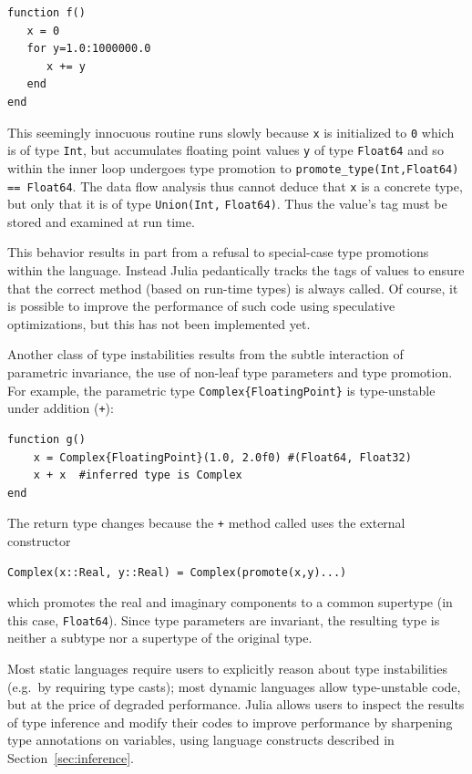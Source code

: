 \documentclass[10pt, preprint]{sigplanconf}
\begin{document}
\begin{lstlisting}
function f()
   x = 0
   for y=1.0:1000000.0
      x += y
   end
end
\end{lstlisting}
%
This seemingly innocuous routine runs slowly because \verb|x| is initialized to
\verb|0| which is of type \verb|Int|, but accumulates floating point values
\verb|y| of type \verb|Float64| and so within the inner loop undergoes type
promotion to \verb|promote_type(Int,Float64)| \verb|== Float64|. The data flow
analysis thus cannot deduce that \verb|x| is a concrete type, but only that it
is of type \verb|Union(Int,| \verb|Float64)|. Thus the value's tag must be
stored and examined at run time.

This behavior results in part from a refusal to special-case type promotions
within the language. Instead Julia pedantically tracks the tags of values to
ensure that the correct method (based on run-time types) is always called.
Of course, it is possible to improve the performance of such code using
speculative optimizations, but this has not been implemented yet.

Another class of type instabilities results from the subtle interaction of
parametric invariance, the use of non-leaf type parameters and type promotion.
For example, the parametric type \verb|Complex{FloatingPoint}| is
type-unstable under addition (\verb|+|):

\begin{lstlisting}
function g()
    x = Complex{FloatingPoint}(1.0, 2.0f0) #(Float64, Float32)
    x + x  #inferred type is Complex
end
\end{lstlisting}
%
The return type changes because the \verb|+| method called uses the external
constructor

\begin{lstlisting}
Complex(x::Real, y::Real) = Complex(promote(x,y)...)
\end{lstlisting}
%
which promotes the real and imaginary components to a common supertype (in this
case, \verb|Float64|). Since type parameters are invariant, the resulting type
is neither a subtype nor a supertype of the original type.

Most static languages require users to explicitly reason about type
instabilities (e.g.\ by requiring type casts); most dynamic languages allow
type-unstable code, but at the price of degraded performance. Julia allows
users to inspect the results of type inference and modify their codes to
improve performance by sharpening type annotations on variables, using language
constructs described in Section~\ref{sec:inference}.
\end{document}
